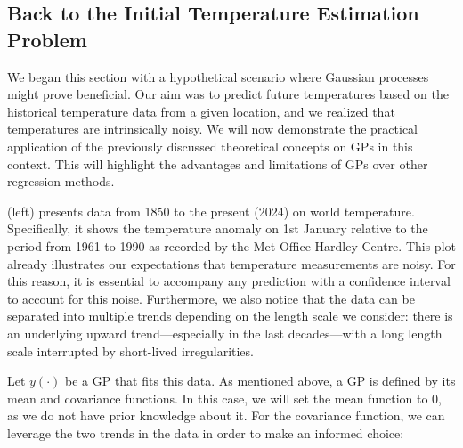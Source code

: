 \subsection{Back to the Initial Temperature Estimation Problem}
We began this section with a hypothetical scenario where Gaussian processes might prove beneficial. Our aim was to predict future temperatures based on the historical temperature data from a given location, and we realized that temperatures are intrinsically noisy. We will now demonstrate the practical application of the previously discussed theoretical concepts on GPs in this context. This will highlight the advantages and limitations of GPs over other regression methods.


 (left) presents data from 1850 to the present (2024) on world temperature. Specifically, it shows the temperature anomaly on 1st January relative to the period from 1961 to 1990 as recorded by the Met Office Hardley Centre. This plot already illustrates our expectations that temperature measurements are noisy. For this reason, it is essential to accompany any prediction with a confidence interval to account for this noise. Furthermore, we also notice that the data can be separated into multiple trends depending on the length scale we consider: there is an underlying upward trend---especially in the last decades---with a long length scale interrupted by short-lived irregularities.

Let $y(\cdot)$ be a GP that fits this data. As mentioned above, a GP is defined by its mean and covariance functions. In this case, we will set the mean function to $0$, as we do not have prior knowledge about it. For the covariance function, we can leverage the two trends in the data in order to make an informed choice:

